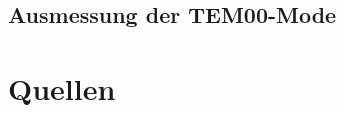 \documentclass[]{scrartcl}
\begin{document}
\subsection{Ausmessung der TEM00-Mode}

\section{Quellen}
\end{document}
